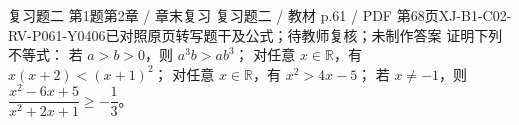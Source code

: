 \par\noindent\begin{minipage}{\linewidth}
\begin{bankitem}{复习题二 第1题}{第2章 / 章末复习 复习题二 / 教材 p.61 / PDF 第68页}{XJ-B1-C02-RV-P061-Y0406}{已对照原页转写题干及公式；待教师复核；未制作答案}
证明下列不等式：
若 $a>b>0$，则 $a^3b>ab^3$；
对任意 $x\in\mathbb R$，有 $x(x+2)<(x+1)^2$；
对任意 $x\in\mathbb R$，有 $x^2>4x-5$；
若 $x\ne-1$，则 $\dfrac{x^2-6x+5}{x^2+2x+1}\ge-\dfrac13$。
\end{bankitem}
\end{minipage}\par\medskip

